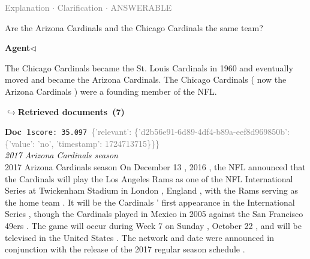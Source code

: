 \documentclass[a4paper,11pt]{article}
\begin{document}
\vspace{0.5em}
\hfill{\tiny\textcolor{gray}{Explanation $\cdot$ Clarification $\cdot$ ANSWERABLE}}
\begin{userbubble}
Are the Arizona Cardinals and the Chicago Cardinals the same team?
\end{userbubble}
\noindent\hfill{\small\textcolor{agentcolor}{\textbf{Agent\enspace$\triangleleft$}}}
\begin{agentbubble}
The Chicago Cardinals became the St. Louis Cardinals in 1960 and eventually moved and became the Arizona Cardinals. The Chicago Cardinals ( now the Arizona Cardinals ) were a founding member of the NFL.
\end{agentbubble}
\noindent\hfill{\footnotesize\textcolor{doccolor}{\textbf{$\hookrightarrow$\enspace Retrieved documents~(7)}}}
\begin{docenv}
{\footnotesize\textcolor{doccolor}{\textbf{Doc~1}}}\hfill{\tiny\texttt{score:~35.097}}\ {\tiny\textcolor{gray}{\{'relevant': \{'d2b56e91-6d89-4df4-b89a-eef8d969850b': \{'value': 'no', 'timestamp': 1724713715\}\}\}}}\\[3pt]
{\small\textit{2017 Arizona Cardinals season}}\\[2pt]
\vspace{2pt}
{\footnotesize 2017 Arizona Cardinals season
On December 13 , 2016 , the NFL announced that the Cardinals will play the Los Angeles Rams as one of the NFL International Series at Twickenham Stadium in London , England , with the Rams serving as the home team . It will be the Cardinals ' first appearance in the International Series , though the Cardinals played in Mexico in 2005 against the San Francisco 49ers . The game will occur during Week 7 on Sunday , October 22 , and will be televised in the United States . The network and date were announced in conjunction with the release of the 2017 regular season schedule .}
\end{docenv}
\end{document}
